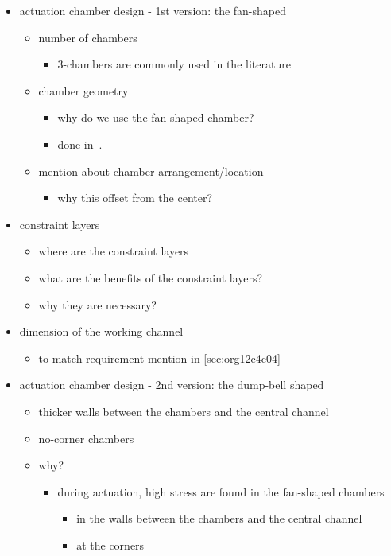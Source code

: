 \documentclass[journal,onecolumn]{IEEEtran}
\begin{document}
\begin{itemize}
\item actuation chamber design - 1st version: the fan-shaped 
\begin{itemize}
\item number of chambers
\begin{itemize}
\item 3-chambers are commonly used in the literature
\end{itemize}
\item chamber geometry
\begin{itemize}
\item why do we use the fan-shaped chamber?
\item done in~\cite{martinez2012robotic}.
\end{itemize}
\item mention about chamber arrangement/location
\begin{itemize}
\item why this offset from the center?
\end{itemize}
\end{itemize}
\item constraint layers
\begin{itemize}
\item where are the constraint layers
\item what are the benefits of the constraint layers?
\item why they are necessary?
\end{itemize}
\item dimension of the working channel
\begin{itemize}
\item to match requirement mention in \ref{sec:org12c4c04}
\end{itemize}

\item actuation chamber design - 2nd version: the dump-bell shaped
\begin{itemize}
\item thicker walls between the chambers and the central channel
\item no-corner chambers
\item why?
\begin{itemize}
\item during actuation, high stress are found in the fan-shaped chambers 
\begin{itemize}
\item in the walls between the chambers and the central channel
\item at the corners
\end{itemize}
\end{itemize}
\end{itemize}
\end{itemize}
\end{document}
